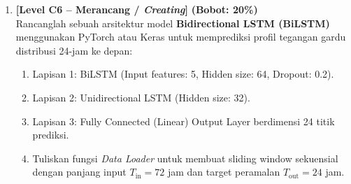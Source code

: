 \documentclass[11pt,a4paper]{article}
\begin{document}
\begin{enumerate}[leftmargin=1.5em, label=\textbf{Soal \arabic*.}]
    \item \textbf{[Level C6 -- Merancang / \textit{Creating}]} \hfill \textbf{(Bobot: 20\%)} \\
    Rancanglah sebuah arsitektur model \textbf{Bidirectional LSTM (BiLSTM)} menggunakan PyTorch atau Keras untuk memprediksi profil tegangan gardu distribusi 24-jam ke depan:
    \begin{enumerate}[label=\alph*.]
        \item Lapisan 1: BiLSTM (Input features: 5, Hidden size: 64, Dropout: 0.2).
        \item Lapisan 2: Unidirectional LSTM (Hidden size: 32).
        \item Lapisan 3: Fully Connected (Linear) Output Layer berdimensi 24 titik prediksi.
        \item Tuliskan fungsi \textit{Data Loader} untuk membuat sliding window sekuensial dengan panjang input $T_{\text{in}} = 72$ jam dan target peramalan $T_{\text{out}} = 24$ jam.
    \end{enumerate}

\end{enumerate}
\end{document}
